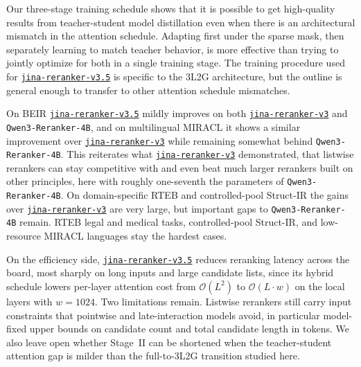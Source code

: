 \documentclass{article}
\newcommand{\jrrvthree}{\href{https://huggingface.co/jinaai/jina-reranker-v3}{\texttt{jina-reranker-v3}}}
\newcommand{\jrrvthreefive}{\href{https://huggingface.co/jinaai/jina-reranker-v3.5}{\texttt{jina-reranker-v3.5}}}
\newcommand{\qwenrankerlarge}{\texttt{Qwen3-Reranker-4B}}
\begin{document}
Our three-stage training schedule shows that it is possible to get high-quality results from teacher-student model distillation even when there is an architectural mismatch in the attention schedule. Adapting first under the sparse mask, then separately learning to match teacher behavior, is more effective than trying to jointly optimize for both in a single training stage. The training procedure used for \jrrvthreefive{} is specific to the 3L2G architecture, but the outline is general enough to transfer to other attention schedule mismatches.


On BEIR \jrrvthreefive{} mildly improves on both \jrrvthree{} and \qwenrankerlarge{}, and on multilingual MIRACL it shows a similar improvement over \jrrvthree{} while remaining somewhat behind \qwenrankerlarge{}. This reiterates what \jrrvthree{} demonstrated, that listwise rerankers can stay competitive with and even beat much larger rerankers built on other principles, here with roughly one-seventh the parameters of \qwenrankerlarge{}. On domain-specific RTEB and controlled-pool Struct-IR the gains over \jrrvthree{} are very large, but important gaps to \qwenrankerlarge{} remain. RTEB legal and medical tasks, controlled-pool Struct-IR, and low-resource MIRACL languages stay the hardest cases.

On the efficiency side, \jrrvthreefive{} reduces reranking latency across the board, most sharply on long inputs and large candidate lists, since its hybrid schedule lowers per-layer attention cost from $\mathcal{O}(L^2)$ to $\mathcal{O}(L\cdot w)$ on the local layers with $w=1024$. Two limitations remain. Listwise rerankers still carry input constraints that pointwise and late-interaction models avoid, in particular model-fixed upper bounds on candidate count and total candidate length in tokens. We also leave open whether Stage~II can be shortened when the teacher-student attention gap is milder than the full-to-3L2G transition studied here.
\end{document}
